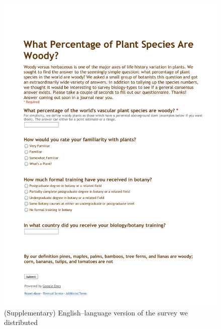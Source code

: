 \documentclass[a4paper,12pt]{article}
\begin{document}
\begin{figure}[p]
  \centering
  \vspace{-20ex}
  \includegraphics[scale=0.7]{figs/Survey_supplemental}
  \caption{(Supplementary) English--language version of the survey we
    distributed}
  \label{fig:survey-text}
\end{figure}
\end{document}
